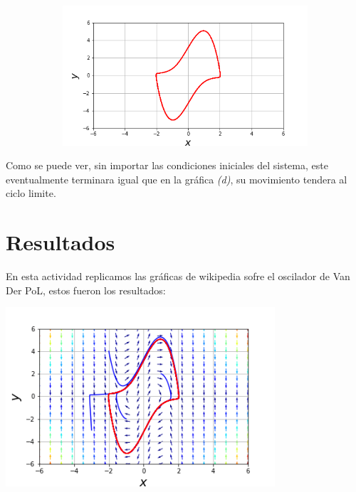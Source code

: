 \documentclass{article}
\begin{document}
\begin{figure}[h!]
\begin{subfigure}[b]{0.45\linewidth}
    \caption{}
  \end{subfigure}
  \begin{subfigure}[b]{0.45\linewidth}
    \includegraphics[width=\linewidth]{EspacioFase.png}
    \caption{}
  \end{subfigure}
\end{figure}

Como se puede ver, sin importar las condiciones iniciales del sistema, este eventualmente terminara igual que en la gráfica \textit{(d)}, su movimiento tendera al ciclo limite. 


\section{Resultados}

En esta actividad replicamos las gráficas  de wikipedia sofre el oscilador de Van Der PoL, estos fueron los resultados:

\begin{center}
	\includegraphics[width=10cm]{PrimeraFig.png}
    
\end{center}
\vspace{0.3cm}
\end{document}
